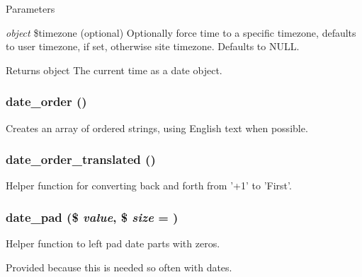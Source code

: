 \begin{DoxyParams}{Parameters}
\item[{\em object}]\$timezone (optional) Optionally force time to a specific timezone, defaults to user timezone, if set, otherwise site timezone. Defaults to NULL.\end{DoxyParams}
\begin{DoxyReturn}{Returns}
object The current time as a date object. 
\end{DoxyReturn}
\hypertarget{date__api_8module_a44f5858b603c1aa92edba8f3c4cb2f5f}{
\subsubsection[{date\_\-order}]{\setlength{\rightskip}{0pt plus 5cm}date\_\-order ()}}
\label{date__api_8module_a44f5858b603c1aa92edba8f3c4cb2f5f}
Creates an array of ordered strings, using English text when possible. \hypertarget{date__api_8module_aa8e424ca2cbdf83c3f16be8192370ed8}{
\subsubsection[{date\_\-order\_\-translated}]{\setlength{\rightskip}{0pt plus 5cm}date\_\-order\_\-translated ()}}
\label{date__api_8module_aa8e424ca2cbdf83c3f16be8192370ed8}
Helper function for converting back and forth from '+1' to 'First'. \hypertarget{date__api_8module_af51cb5e8020a77ecaa2925b3246c1576}{
\subsubsection[{date\_\-pad}]{\setlength{\rightskip}{0pt plus 5cm}date\_\-pad (\$ {\em value}, \/  \$ {\em size} = {})}}
\label{date__api_8module_af51cb5e8020a77ecaa2925b3246c1576}
Helper function to left pad date parts with zeros.

Provided because this is needed so often with dates.


